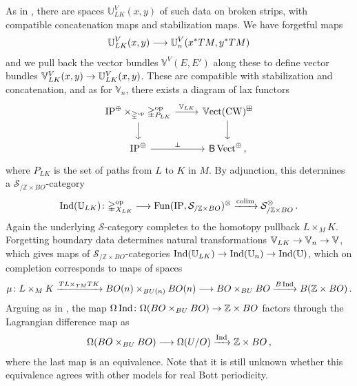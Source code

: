 \documentclass[10pt]{amsart}
\numberwithin{equation}{section}
\theoremstyle{definition}
\DeclareMathOperator{\Fun}{Fun}
\DeclareMathOperator{\op}{op}
\DeclareMathOperator{\Ind}{Ind}
\DeclareMathOperator{\Vect}{Vect}
\DeclareMathOperator{\bVect}{\mathbb{V}ect}
\DeclareMathOperator{\CW}{CW}
\DeclareMathOperator*{\colim}{colim}
\newcommand{\bZ}{\mathbb{Z}}
\newcommand{\bU}{\mathbb{U}}
\newcommand{\bV}{\mathbb{V}}
\newcommand{\Simp}{\mathbb{\Delta}}
\newcommand{\cS}{\mathcal{S}}
\newcommand{\IP}{\mathrm{IP}}
\newcommand{\sfB}{\mathsf{B}}
\renewcommand{\to}{\mathchoice{\longrightarrow}{\rightarrow}{}{}}
\begin{document}
	As in \cite{porcelli2024spectral}, there are spaces $\bU^{V}_{LK}(x,y)$ of such data on broken strips, with compatible concatenation maps and stabilization maps.
  We have forgetful maps
	\begin{align*}
		\bU^{V}_{LK}(x,y) \to \bU^{V}_{n}(x^{*}TM, y^{*}TM)
	\end{align*}
	and we pull back the vector bundles $\bV^{V}(E,E')$ along these to define vector bundles $\bV^{V}_{LK}(x,y) \to \bU^{V}_{LK}(x,y)$.
  These are compatible with stabilization and concatenation, and as for $\bV_{n}$, there exists a diagram of lax functors
	\begin{equation*}
		\begin{tikzcd}
			\IP^{\oplus}\times_{\Simp^{\op}} \Simp^{\op}_{P_{LK}} \arrow[r, "\bV_{LK}"] \arrow[d]      &   \bVect(\CW)^{\boxplus}  \arrow[d] \\
			\IP^{\oplus}  \arrow[r,"\perp"]               &  \sfB \Vect^{\oplus}\,,
		\end{tikzcd}
	\end{equation*}
	where $P_{LK}$ is the set of paths from $L$ to $K$ in $M$.
  By adjunction, this determines a $\cS_{/ \bZ\times BO}$-category
	\begin{align*}
		\Ind(\bU_{LK})\colon \Simp^{\op}_{X_{LK}} \to \Fun(\IP, \cS_{/ \bZ\times BO})^{\otimes} \xrightarrow{\colim} \cS_{/ \bZ\times BO}^{\otimes}\,.
	\end{align*}
	Again the underlying $\cS$-category completes to the homotopy pullback $L\times_{M}K$.
  Forgetting boundary data determines natural transformations $\bV_{LK}\to \bV_{n} \to \bV$, which gives maps of $\cS_{/ \bZ\times BO}$-categories $\Ind(\bU_{LK}) \to \Ind(\bU_{n}) \to \Ind(\bU)$, which on completion corresponds to maps of spaces
	\begin{align*}
		\mu \colon L\times_{M}K \xrightarrow{TL\times_{TM}TK} BO(n)\times_{BU(n)} BO(n) \to BO\times_{BU} BO \xrightarrow{B\Ind} B(\bZ\times BO) \,.
	\end{align*}
	Arguing as in \cite{bonciocat2025floer}, the map $\Omega\Ind\colon \Omega (BO\times_{BU}BO) \to\bZ\times BO$ factors through the Lagrangian difference map as
	\begin{align*}
		\Omega(BO\times_{BU} BO ) \to \Omega(U/O) \xrightarrow{\Ind} \bZ \times BO \,,
	\end{align*}
	where the last map is an equivalence.
  Note that it is still unknown whether this equivalence agrees with other models for real Bott periodicity.
\end{document}
